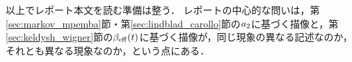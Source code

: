 \documentclass[a4paper,11pt,onecolumn]{jlreq}
\begin{document}
以上でレポート本文を読む準備は整う．
レポートの中心的な問いは，第\ref{sec:markov_mpemba}節・第\ref{sec:lindblad_carollo}節の$a_{2}$に基づく描像と，第\ref{sec:keldysh_wigner}節の$\beta_{\mathrm{eff}}(t)$に基づく描像が，同じ現象の異なる記述なのか，それとも異なる現象なのか，という点にある．



\end{document}
